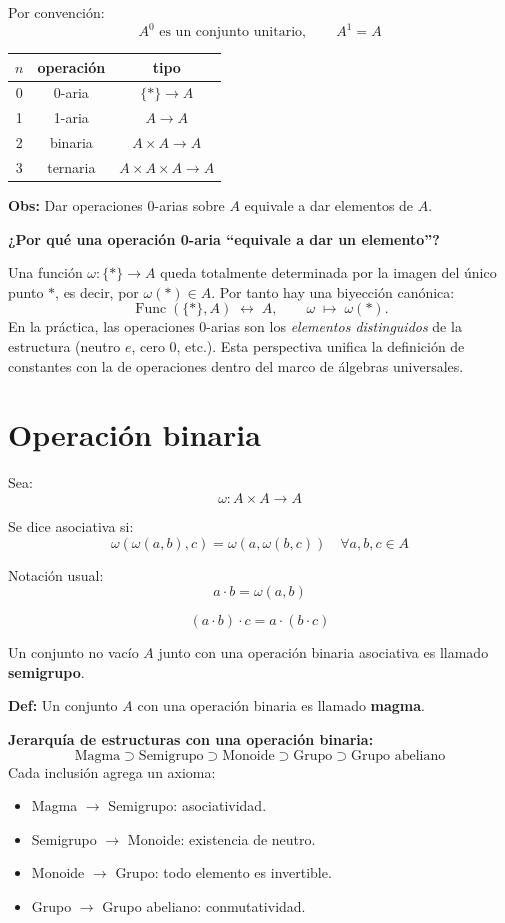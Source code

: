 \documentclass[12pt]{article}
\begin{document}
Por convención:
\[
A^0 \text{ es un conjunto unitario}, \qquad A^1=A
\]

\begin{center}
\begin{tabular}{c|c|c}
$n$ & operación & tipo \\
\hline
0 & 0-aria & $\{*\}\to A$ \\
1 & 1-aria & $A\to A$ \\
2 & binaria & $A\times A\to A$ \\
3 & ternaria & $A\times A\times A\to A$
\end{tabular}
\end{center}

\textbf{Obs:} Dar operaciones 0-arias sobre $A$ equivale a dar elementos de $A$.

\begin{tcolorbox}[iabox]
\textbf{¿Por qué una operación 0-aria ``equivale a dar un elemento''?}

Una función $\omega:\{*\}\to A$ queda totalmente determinada por la imagen del único punto $*$, es decir, por $\omega(*)\in A$. Por tanto hay una biyección canónica:
\[
  \operatorname{Func}(\{*\},A) \;\longleftrightarrow\; A, \qquad \omega \;\mapsto\; \omega(*).
\]
En la práctica, las operaciones 0-arias son los \emph{elementos distinguidos} de la estructura (neutro $e$, cero $0$, etc.). Esta perspectiva unifica la definición de constantes con la de operaciones dentro del marco de álgebras universales.
\end{tcolorbox}

\section*{Operación binaria}

Sea:
\[
\omega:A\times A\to A
\]

Se dice asociativa si:
\[
\omega(\omega(a,b),c)=\omega(a,\omega(b,c)) \quad \forall a,b,c\in A
\]

Notación usual:
\[
a\cdot b=\omega(a,b)
\]

\[
(a\cdot b)\cdot c=a\cdot(b\cdot c)
\]

Un conjunto no vacío $A$ junto con una operación binaria asociativa es llamado \textbf{semigrupo}.

\textbf{Def:} Un conjunto $A$ con una operación binaria es llamado \textbf{magma}.

\begin{tcolorbox}[iabox]
\textbf{Jerarquía de estructuras con una operación binaria:}
\[
  \text{Magma} \supset \text{Semigrupo} \supset \text{Monoide} \supset \text{Grupo} \supset \text{Grupo abeliano}
\]
Cada inclusión agrega un axioma:
\begin{itemize}
  \item Magma $\to$ Semigrupo: asociatividad.
  \item Semigrupo $\to$ Monoide: existencia de neutro.
  \item Monoide $\to$ Grupo: todo elemento es invertible.
  \item Grupo $\to$ Grupo abeliano: conmutatividad.
\end{itemize}
\end{tcolorbox}
\end{document}
